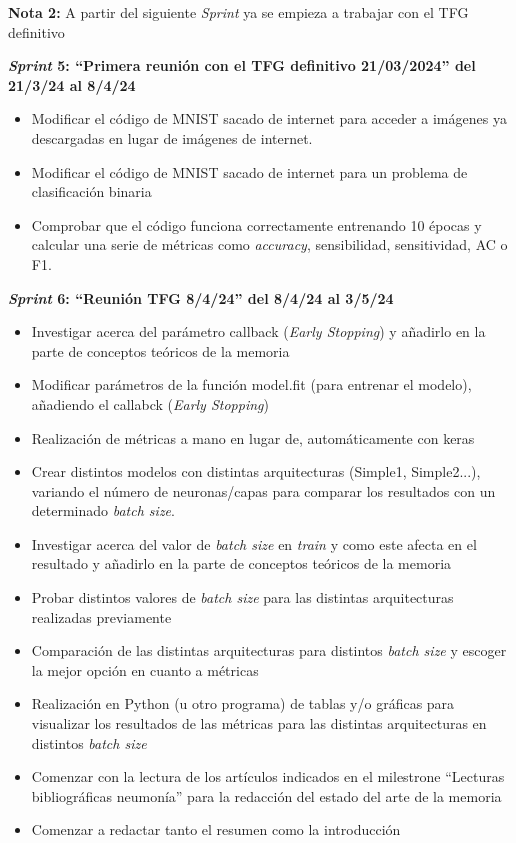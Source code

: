 \textbf{Nota 2:} A partir del siguiente \textit{Sprint} ya se empieza a trabajar con el TFG definitivo

\textbf{\textit{Sprint} 5: ``Primera reunión con el TFG definitivo 21/03/2024'' del 21/3/24 al 8/4/24}
\begin{itemize}
    \item Modificar el código de MNIST sacado de internet para acceder a imágenes ya descargadas en lugar de imágenes de internet.
    \item Modificar el código de MNIST sacado de internet para un problema de clasificación binaria
    \item Comprobar que el código funciona correctamente entrenando 10 épocas y calcular una serie de métricas como \textit{accuracy}, sensibilidad, sensitividad, AC o F1.
\end{itemize}

\textbf{\textit{Sprint} 6: ``Reunión TFG 8/4/24'' del 8/4/24 al 3/5/24}
\begin{itemize}
    \item Investigar acerca del parámetro callback (\textit{Early Stopping}) y añadirlo en la parte de conceptos teóricos de la memoria
    \item Modificar parámetros de la función model.fit (para entrenar el modelo), añadiendo el callabck (\textit{Early Stopping})
    \item Realización de métricas a mano en lugar de, automáticamente con keras
    \item Crear distintos modelos con distintas arquitecturas (Simple1, Simple2...), variando el número de neuronas/capas para comparar los resultados con un determinado \textit{batch size}.
    \item Investigar acerca del valor de \textit{batch size} en \textit{train} y como este afecta en el resultado y añadirlo en la parte de conceptos teóricos de la memoria
    \item Probar distintos valores de \textit{batch size} para las distintas arquitecturas realizadas previamente
    \item Comparación de las distintas arquitecturas para distintos \textit{batch size} y escoger la mejor opción en cuanto a métricas
    \item Realización en Python (u otro programa) de tablas y/o gráficas para visualizar los resultados de las métricas para las distintas arquitecturas en distintos \textit{batch size}
    \item Comenzar con la lectura de los artículos indicados en el milestrone ``Lecturas bibliográficas neumonía'' para la redacción del estado del arte de la memoria
    \item Comenzar a redactar tanto el resumen como la introducción 
\end{itemize}

